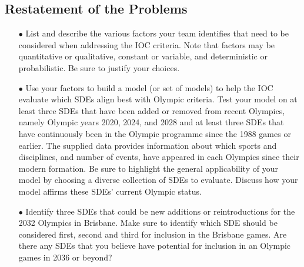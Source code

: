 \documentclass[a4paper]{article}
\begin{document}
\subsection{Restatement of the Problems}
\begin{itemize}
\item[$\bullet$]List and describe the various factors your team identifies that need to be
considered when addressing the IOC criteria. Note that factors may be quantitative or qualitative,
constant or variable, and deterministic or probabilistic. Be sure to justify your choices.
\item[$\bullet$]Use your factors to build a model (or set of models) to help the IOC evaluate
which SDEs align best with Olympic criteria. Test your model on at least three SDEs that have been added or removed from recent
Olympics, namely Olympic years 2020, 2024, and 2028 and at least three SDEs that have
continuously been in the Olympic programme since the 1988 games or earlier. The
supplied data provides information about which sports and
disciplines, and number of events, have appeared in each Olympics since their modern
formation. Be sure to highlight the general applicability of your model by choosing a
diverse collection of SDEs to evaluate. Discuss how your model affirms these SDEs’
current Olympic status.
\item[$\bullet$]Identify three SDEs that could be new additions or reintroductions for the 2032 Olympics
in Brisbane. Make sure to identify which SDE should be considered first, second and
third for inclusion in the Brisbane games. Are there any SDEs that you believe have
potential for inclusion in an Olympic games in 2036 or beyond?
\end{itemize}
\end{document}
